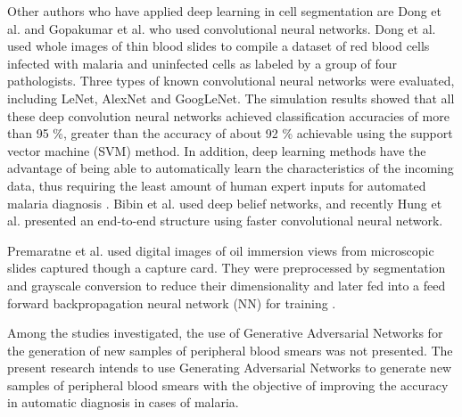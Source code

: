 Other authors who have applied deep learning in cell segmentation are Dong et al. and Gopakumar et al. who used convolutional neural networks. Dong et al. used whole images of thin blood slides to compile a dataset of red blood cells infected with malaria and uninfected cells as labeled by a group of four pathologists. Three types of known convolutional neural networks were evaluated, including LeNet, AlexNet and GoogLeNet. The simulation results showed that all these deep convolution neural networks achieved classification accuracies of more than 95 \%, greater than the accuracy of about 92 \% achievable using the support vector machine (SVM) method. In addition, deep learning methods have the advantage of being able to automatically learn the characteristics of the incoming data, thus requiring the least amount of human expert inputs for automated malaria diagnosis \cite {Dong2017} \cite{Dong2017a}. Bibin et al. used deep belief networks, and recently Hung et al. presented an end-to-end structure using faster convolutional neural network.

Premaratne et al. used digital images of oil immersion views from microscopic slides captured though a capture card. They were preprocessed by segmentation and grayscale conversion to reduce their dimensionality and later fed into a feed forward backpropagation neural network (NN) for training \cite{Premaratne2006AFilms}.

Among the studies investigated, the use of Generative Adversarial Networks for the generation of new samples of peripheral blood smears was not presented. The present research intends to use Generating Adversarial Networks to generate new samples of peripheral blood smears with the objective of improving the accuracy in automatic diagnosis in cases of malaria.



